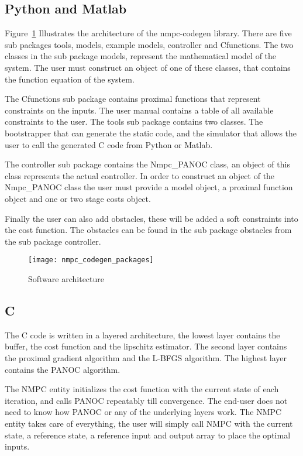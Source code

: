 \subsection{Python and Matlab}
Figure~\ref{fig:nmpc_codegen_packages} Illustrates the architecture of the nmpc-codegen library. There are five sub packages tools, models, example models, controller and Cfunctions.  The two classes in the sub package models, represent the mathematical model of the system. The user must construct an object of one of these classes, that contains the function equation of the system.

The Cfunctions sub package contains proximal functions that represent constraints on the inputs. The user manual contains a table of all available constraints to the user. The tools sub package contains two classes. The bootstrapper that can generate the static code, and the simulator that allows the user to call the generated C code from Python or Matlab.

The controller sub package contains the Nmpc\_PANOC class, an object of this class represents the actual controller. In order to construct an object of the Nmpc\_PANOC class the user must provide a model object, a proximal function object and one or two stage costs object.

Finally the user can also add obstacles, these will be added a soft constraints into the cost function. The obstacles can be found in the sub package obstacles from the sub package controller.
	\begin{figure}[H]
		\centering
		\texttt{[image: nmpc\_codegen\_packages]}
		\caption{Software architecture}
		\label{fig:nmpc_codegen_packages}
	\end{figure}

\subsection{C}
The C code is written in a layered architecture, the lowest layer contains the buffer, the cost function and the lipschitz estimator. The second layer contains the proximal gradient algorithm and the L-BFGS algorithm. The highest layer contains the PANOC algorithm.

The NMPC entity initializes the cost function with the current state of each iteration, and calls PANOC repeatably till convergence. The end-user does not need to know how PANOC or any of the underlying layers work. The NMPC entity takes care of everything, the user will simply call NMPC with the current state, a reference state, a reference input and output array to place the optimal inputs.

